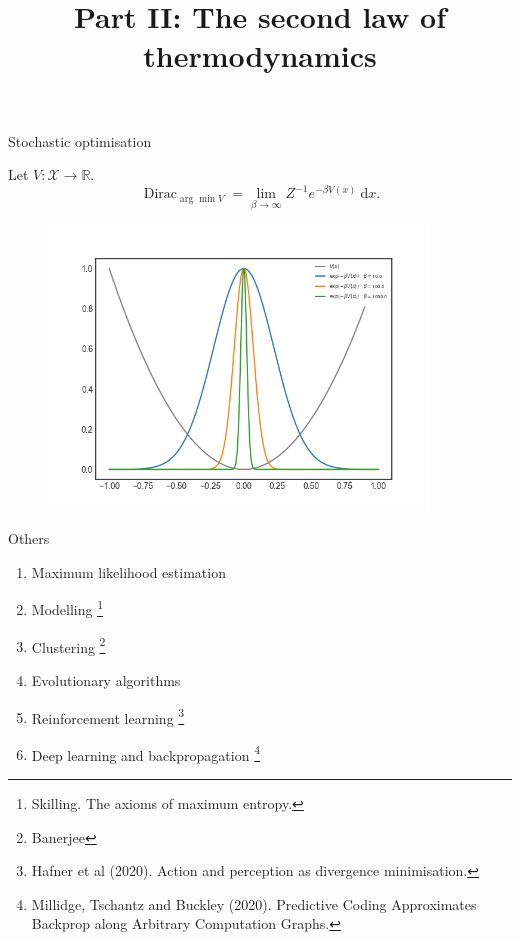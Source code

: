 \documentclass{beamer}
\newcommand{\R}{\mathbb R}
\renewcommand{\d}{\: \mathrm{d}}
\begin{document}
\begin{frame}{Stochastic optimisation}
  
Let $V: \mathcal X \to \R$.
\begin{equation*}
   \operatorname{Dirac}_{\arg\min V}= \lim_{\beta \to \infty} Z^{-1}e^{-\beta V(x)} \d x.
\end{equation*}  
\begin{figure}
    \centering
    \includegraphics[width=0.9\textwidth]{Unnormalised_Gibbs_distribution.png}
\end{figure}
\end{frame}

\begin{frame}{Others}
\begin{enumerate}
    \item Maximum likelihood estimation
    \item Modelling \footnote{Skilling. The axioms of maximum entropy.}
    \item Clustering \footnote{Banerjee}
    \item Evolutionary algorithms
    \item Reinforcement learning \footnote{Hafner et al (2020). Action and perception as divergence minimisation.}
    \item Deep learning and backpropagation \footnote{Millidge, Tschantz and Buckley (2020). Predictive Coding Approximates Backprop along Arbitrary Computation Graphs.}
\end{enumerate}
\end{frame}


\begin{frame}{}
\title{Part II: The second law of thermodynamics}
\author{\vspace{-5ex}}
\institute{\vspace{-5ex}}
\date{\vspace{-5ex}}
    \maketitle
    \small
\end{frame}
\end{document}
